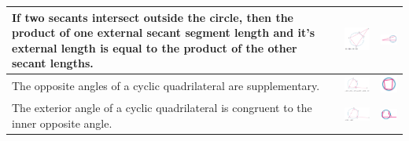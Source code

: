 \documentclass{book}
\begin{document}
\begin{center}
\begin{tabular}[center]{|p{5cm}|p{3cm}|p{2cm}|}
		If two secants intersect outside the circle, then the product of one external secant segment length and it's external length is equal to the product of the other secant lengths.                                            & \includegraphics[width=3cm]{circle theorem 13} & \includegraphics[width=2cm]{circle theorem 13 symbol} \\ \hline
		The opposite angles of a cyclic quadrilateral are supplementary.                                                                                                                                                             & \includegraphics[width=3cm]{circle theorem 14} & \includegraphics[width=2cm]{circle theorem 14 symbol} \\ \hline
		The exterior angle of a cyclic quadrilateral is congruent to the inner opposite angle.                                                                                                                                       & \includegraphics[width=3cm]{circle theorem 15} & \includegraphics[width=2cm]{circle theorem 15 symbol} \\ \hline
	\end{tabular}
\end{center}
\end{document}
